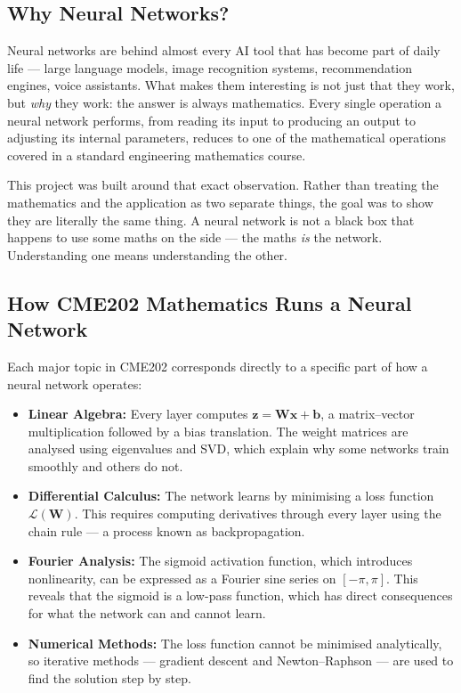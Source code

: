 \documentclass[12pt,a4paper]{article}
\begin{document}
\subsection{Why Neural Networks?}

Neural networks are behind almost every AI tool that has become part of daily life --- large language models, image recognition systems, recommendation engines, voice assistants. What makes them interesting is not just that they work, but \textit{why} they work: the answer is always mathematics. Every single operation a neural network performs, from reading its input to producing an output to adjusting its internal parameters, reduces to one of the mathematical operations covered in a standard engineering mathematics course.

This project was built around that exact observation. Rather than treating the mathematics and the application as two separate things, the goal was to show they are literally the same thing. A neural network is not a black box that happens to use some maths on the side --- the maths \textit{is} the network. Understanding one means understanding the other.

\subsection{How CME202 Mathematics Runs a Neural Network}

Each major topic in CME202 corresponds directly to a specific part of how a neural network operates:

\begin{itemize}[leftmargin=2em, itemsep=4pt]
  \item \textbf{Linear Algebra:} Every layer computes $\mathbf{z} = \mathbf{W}\mathbf{x} + \mathbf{b}$, a matrix--vector multiplication followed by a bias translation. The weight matrices are analysed using eigenvalues and SVD, which explain why some networks train smoothly and others do not.

  \item \textbf{Differential Calculus:} The network learns by minimising a loss function $\mathcal{L}(\mathbf{W})$. This requires computing derivatives through every layer using the chain rule --- a process known as backpropagation.

  \item \textbf{Fourier Analysis:} The sigmoid activation function, which introduces nonlinearity, can be expressed as a Fourier sine series on $[-\pi, \pi]$. This reveals that the sigmoid is a low-pass function, which has direct consequences for what the network can and cannot learn.

  \item \textbf{Numerical Methods:} The loss function cannot be minimised analytically, so iterative methods --- gradient descent and Newton--Raphson --- are used to find the solution step by step.
\end{itemize}
\end{document}
